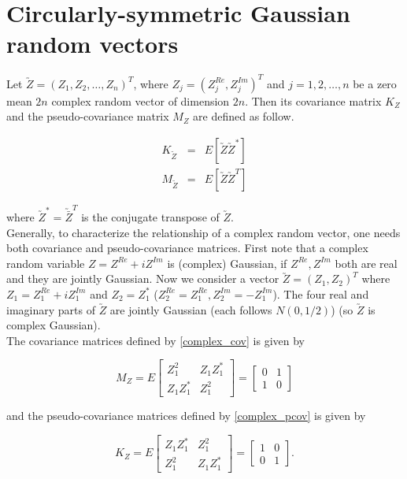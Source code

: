 \section{Circularly-symmetric Gaussian random vectors}

Let $\utilde{Z} = (Z_1, Z_2, \ldots, Z_n)^T$, where $Z_j = (Z_j^{Re}, Z_j^{Im})^T$ and $j=1,2,\ldots, n$ be a zero mean $2n$ complex random vector of dimension $2n$. Then its covariance matrix $K_Z$ and the pseudo-covariance matrix $M_Z$ are defined as follow.

\begin{eqnarray} 
\label{complex_cov}
K_{\utilde{Z}} &=& E[\utilde{Z}\utilde{Z}^*]\\
\label{complex_pcov}
M_{\utilde{Z}} &=& E[\utilde{Z}\utilde{Z}^T]
\end{eqnarray}

where $\utilde{Z}^* = \utilde{\bar{Z}}^T$ is the conjugate transpose of $\utilde{Z}$.\\

Generally, to characterize the relationship of a complex random vector, one needs both covariance and pseudo-covariance matrices. First note that a complex random variable $Z = Z^{Re} + iZ^{Im}$ is (complex) Gaussian, if $Z^{Re}, Z^{Im}$ both are real and they are jointly Gaussian. Now we consider a vector $\utilde{Z}=(Z_1, Z_2)^T$ where $Z_1=Z_1^{Re }+i Z_1^{Im}$ and $Z_2=Z_1^*$ ($Z_2^{Re}=Z_1^{Re }, Z_2^{Im}=-Z_1^{Im}$). The four real and imaginary parts of $\utilde{Z}$ are jointly Gaussian (each follows $N(0,1/2)$) (so $\utilde{Z}$ is complex Gaussian). \\

The covariance matrices defined by \eqref{complex_cov} is given by

\[
M_Z = E \begin{bmatrix}
Z_1^2 & Z_1Z_1^*\\
Z_1Z_1^* & Z_1^2
\end{bmatrix} =
\begin{bmatrix}
0 & 1\\
1 & 0
\end{bmatrix}
\]

and the pseudo-covariance matrices defined by \eqref{complex_pcov} is given by

\[
K_Z= E \begin{bmatrix}
Z_1Z_1^*  & Z_1^2\\
Z_1^2     & Z_1Z_1^*
\end{bmatrix} =
\begin{bmatrix}
1 & 0\\
0 & 1
\end{bmatrix}.
\]

